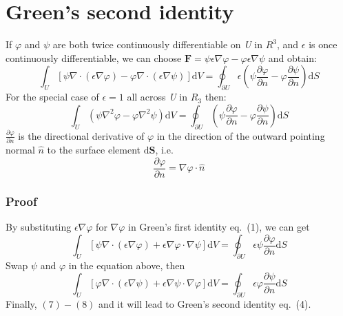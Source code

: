 \documentclass[a4paper]{article}
\begin{document}
\part{Green's second identity}
If $\varphi$ and $\psi$ are both twice continuously differentiable on \textit{U} in $R^{3}$, and $\epsilon$ is once continuously differentiable, we can choose $\bm{F}=\psi\epsilon\nabla\varphi-\varphi\epsilon\nabla\psi$ and obtain:
\begin{equation}
\int_U \left[\psi\nabla\cdot\left(\epsilon\nabla\varphi\right)-\varphi\nabla\cdot\left(\epsilon\nabla\psi\right)\right]\mathrm{d}V=\oint_{\partial U} \epsilon\left(\psi\frac{\partial\varphi}{\partial n}-\varphi\frac{\partial\psi}{\partial n}\right)\mathrm{d}S
\end{equation}
For the special case of $\epsilon=1$ all across \textit{U} in $R_{3}$ then:
\begin{equation}
\int_U \left(\psi\nabla^{2}\varphi-\varphi\nabla^{2}\psi\right)\mathrm{d}V=\oint_{\partial U}\left(\psi\frac{\partial \varphi}{\partial n}-\varphi\frac{\partial\psi}{\partial n}\right)\mathrm{d}S
\end{equation}
$\frac{\partial \varphi}{\partial n}$ is the directional derivative of $\varphi$ in the direction of the outward pointing normal $\hat{n}$ to the surface element $\mathrm{d}\bm{S}$, i.e.
\begin{equation}
\frac{\partial \varphi}{\partial n}=\nabla\varphi\cdot\hat{n}
\end{equation}
\section*{Proof}
By substituting $\epsilon\nabla\varphi$ for $\nabla\varphi$ in Green's first identity eq.~(1), we can get 
\begin{equation}
\int_U \left[\psi\nabla\cdot\left(\epsilon\nabla\varphi\right)+\epsilon\nabla\varphi\cdot\nabla\psi\right]\mathrm{d}V=\oint_{\partial U} \epsilon\psi\frac{\partial\varphi}{\partial n}\mathrm{d}S
\end{equation}
Swap $\psi$ and $\varphi$ in the equation above, then
\begin{equation}
\int_U \left[\varphi\nabla\cdot\left(\epsilon\nabla\psi\right)+\epsilon\nabla\psi\cdot\nabla\varphi\right]\mathrm{d}V=\oint_{\partial U} \epsilon\varphi\frac{\partial\psi}{\partial n}\mathrm{d}S
\end{equation}
Finally, $(7)-(8)$ and it will lead to Green's second identity eq.~(4). 
\end{document}
